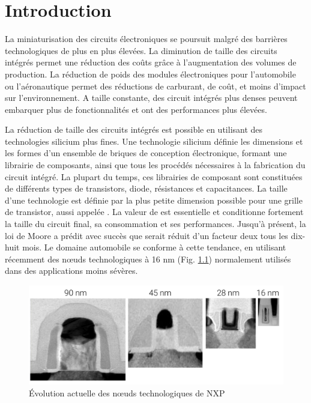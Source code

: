 \chapter{Introduction}

La miniaturisation des circuits électroniques se poursuit malgré des barrières technologiques de plus en plus élevées.
La diminution de taille des circuits intégrés permet une réduction des coûts grâce à l'augmentation des volumes de production.
La réduction de poids des modules électroniques pour l'automobile ou l'aéronautique permet des réductions de carburant, de coût, et moins d'impact sur l'environnement.
A taille constante, des circuit intégrés plus denses peuvent embarquer plus de fonctionnalités et ont des performances plus élevées.

La réduction de taille des circuits intégrés est possible en utilisant des technologies silicium plus fines.
Une technologie silicium définie les dimensions et les formes d'un ensemble de briques de conception électronique, formant une librairie de composants, ainsi que tous les procédés nécessaires à la fabrication du circuit intégré.
La plupart du temps, ces librairies de composant sont constituées de différents types de transistors, diode, résistances et capacitances.
La taille d'une technologie est définie par la plus petite dimension possible pour une grille de transistor, aussi appelée \textlambda.
La valeur de \textlambda{}  est essentielle et conditionne fortement la taille du circuit final, sa consommation et ses performances.
Jusqu'à présent, la loi de Moore a prédit avec succès que \textlambda{}  serait réduit d'un facteur deux tous les dix-huit mois.
Le domaine automobile se conforme à cette tendance, en utilisant récemment des nœuds technologiques à 16 nm (Fig. \ref{fig:nxp-techno-increase}) \cite{evolution_technologies} normalement utilisés dans des applications moins sévères.

\begin{figure}[!h]
  \centering
  \includegraphics[width=\textwidth]{src/1/figures/technology_evolution.pdf}
  \caption{Évolution actuelle des nœuds technologiques de NXP \cite{evolution_technologies}}
  \label{fig:nxp-techno-increase}
\end{figure}

